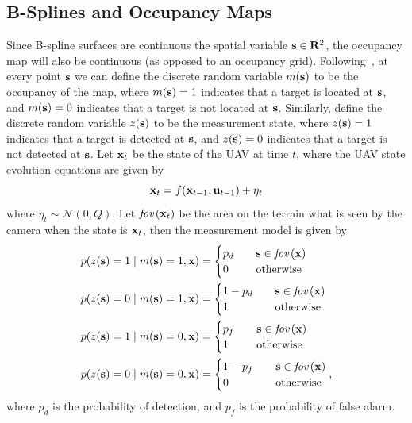 \subsection{B-Splines and Occupancy Maps}

Since B-spline surfaces are continuous the spatial variable $\mathbf{s}\in\mathbf{R}^2$, the occupancy map will also be continuous (as opposed to an occupancy grid).  Following~\cite{RodriguesTsiogkasAguiar20}, at every point $\mathbf{s}$ we can define the discrete random variable $m(\mathbf{s})$ to be the occupancy of the map, where $m(\mathbf{s})=1$ indicates that a target is located at $\mathbf{s}$, and $m(\mathbf{s})=0$ indicates that a target is not located at $\mathbf{s}$.  
%
Similarly, define the discrete random variable $z(\mathbf{s})$ to be the measurement state, where $z(\mathbf{s})=1$ indicates that a target is detected at $\mathbf{s}$, and $z(\mathbf{s})=0$ indicates that a target is not detected at $\mathbf{s}$.
% 
Let $\mathbf{x}_t$ be the state of the UAV at time $t$, where the UAV state evolution equations are given by
\[
\mathbf{x}_t = f(\mathbf{x}_{t-1}, \mathbf{u}_{t-1}) + \eta_t
\]
where $\eta_t\sim\mathcal{N}(0, Q)$. Let $\text{\em fov}\left(\mathbf{x}_t\right)$ be the area on the terrain what is seen by the camera when the state is $\mathbf{x}_t$, then the measurement model is given by
%
\begin{align}
	p(z(\sbf)=1 \mid m(\sbf)=1, \xbf) &= \begin{cases}
 											p_d &\quad \mathbf{s}\in\fov{\xbf} \\
 											0 &\quad \text{otherwise}
 										 \end{cases} 
	\label{eq:prob_z=1:m=1}\\
	p(z(\sbf)=0 \mid m(\sbf)=1, \xbf) &= \begin{cases}
 											1-p_d &\quad \mathbf{s}\in\fov{\xbf} \\
 											1 &\quad \text{otherwise}
 										 \end{cases}
	\label{eq:prob_z=0:m=1}\\
	p(z(\sbf)=1 \mid m(\sbf)=0, \xbf) &= \begin{cases}
 											p_f &\quad \mathbf{s}\in\fov{\xbf} \\
 											1 &\quad \text{otherwise}
 										  \end{cases}
	\label{eq:prob_z=1:m=0}\\
	p(z(\sbf)=0 \mid m(\sbf)=0, \xbf) &= \begin{cases}
 											1-p_f &\quad \mathbf{s}\in\fov{\xbf} \\
 											0 &\quad \text{otherwise}
 										  \end{cases},
 	\label{eq:prob_z=1:m=0}
\end{align}
where $p_d$ is the probability of detection, and $p_f$ is the probability of false alarm.

